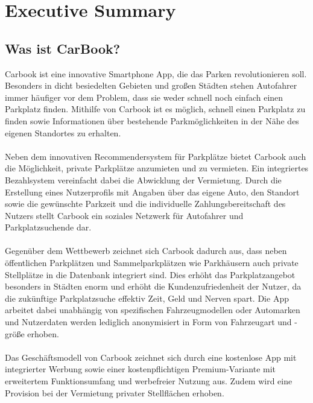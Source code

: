 \documentclass[12pt,ngerman, fleqn]{book} %
\begin{document}


\chapter{Executive Summary}

\section{Was ist CarBook?}
Carbook ist eine innovative Smartphone App, die das Parken revolutionieren soll. Besonders in dicht besiedelten Gebieten und großen Städten stehen Autofahrer immer häufiger vor dem Problem, dass sie weder schnell noch einfach einen Parkplatz finden. Mithilfe von Carbook ist es möglich, schnell einen Parkplatz zu finden sowie Informationen über bestehende Parkmöglichkeiten in der Nähe des eigenen Standortes zu erhalten.\\ \\
Neben dem innovativen Recommendersystem für Parkplätze bietet Carbook auch die Möglichkeit, private Parkplätze anzumieten und zu vermieten. Ein integriertes Bezahlsystem vereinfacht dabei die Abwicklung der Vermietung. Durch die Erstellung eines Nutzerprofils mit Angaben über das eigene Auto, den Standort sowie die gewünschte Parkzeit und die individuelle Zahlungsbereitschaft des Nutzers stellt Carbook ein soziales Netzwerk für Autofahrer und Parkplatzsuchende dar.\\ \\
Gegenüber dem Wettbewerb zeichnet sich Carbook dadurch aus, dass neben öffentlichen Parkplätzen und Sammelparkplätzen wie Parkhäusern auch private Stellplätze in die Datenbank integriert sind. Dies erhöht das Parkplatzangebot besonders in Städten enorm und erhöht die Kundenzufriedenheit der Nutzer, da die zukünftige Parkplatzsuche effektiv Zeit, Geld und Nerven spart. Die App arbeitet dabei unabhängig von spezifischen Fahrzeugmodellen oder Automarken und Nutzerdaten werden lediglich  anonymisiert in Form von Fahrzeugart und -größe erhoben.\\ \\
Das Geschäftsmodell von Carbook zeichnet sich durch eine kostenlose App mit integrierter Werbung sowie einer kostenpflichtigen Premium-Variante mit erweitertem Funktionsumfang und werbefreier Nutzung aus. Zudem wird eine Provision bei der Vermietung privater Stellflächen erhoben.\\ \\
\end{document}

